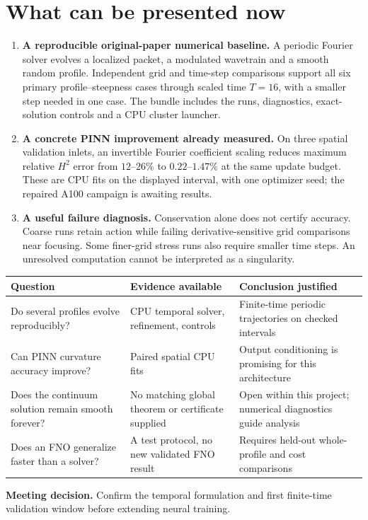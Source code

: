 \documentclass[11pt]{article}
\begin{document}
\section{What can be presented now}
\begin{enumerate}
\item \textbf{A reproducible original-paper numerical baseline.} A periodic Fourier solver evolves a localized packet, a modulated wavetrain and a smooth random profile. Independent grid and time-step comparisons support all six primary profile--steepness cases through scaled time $T=16$, with a smaller step needed in one case. The bundle includes the runs, diagnostics, exact-solution controls and a CPU cluster launcher.
\item \textbf{A concrete PINN improvement already measured.} On three spatial validation inlets, an invertible Fourier coefficient scaling reduces maximum relative $H^2$ error from $12$--$26\%$ to $0.22$--$1.47\%$ at the same update budget. These are CPU fits on the displayed interval, with one optimizer seed; the repaired A100 campaign is awaiting results.
\item \textbf{A useful failure diagnosis.} Conservation alone does not certify accuracy. Coarse runs retain action while failing derivative-sensitive grid comparisons near focusing. Some finer-grid stress runs also require smaller time steps. An unresolved computation cannot be interpreted as a singularity.
\end{enumerate}
\begin{center}\small
\begin{tabular}{p{.25\linewidth}p{.30\linewidth}p{.36\linewidth}}\toprule
Question & Evidence available & Conclusion justified \\\midrule
Do several profiles evolve reproducibly? & CPU temporal solver, refinement, controls & Finite-time periodic trajectories on checked intervals \\
Can PINN curvature accuracy improve? & Paired spatial CPU fits & Output conditioning is promising for this architecture \\
Does the continuum solution remain smooth forever? & No matching global theorem or certificate supplied & Open within this project; numerical diagnostics guide analysis \\
Does an FNO generalize faster than a solver? & A test protocol, no new validated FNO result & Requires held-out whole-profile and cost comparisons \\\bottomrule
\end{tabular}
\end{center}
\noindent\textbf{Meeting decision.} Confirm the temporal formulation and first finite-time validation window before extending neural training.
\clearpage

\clearpage

\clearpage

\clearpage

\clearpage

\clearpage

\clearpage

\end{document}
